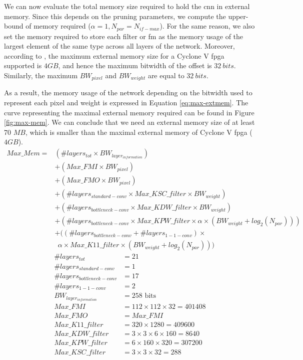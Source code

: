 %
We can now evaluate the total memory size required to hold the \acrshort{cnn} in external memory. Since this depends on the pruning parameters, we compute the upper-bound of memory required ($\alpha = 1, N_{par} = N_{if-max}$). For the same reason, we also set the memory required to store each filter or \acrshort{fm} as the memory usage of the largest element of the same type across all layers of the network. Moreover, according to \cite{noauthor_cyclone_2018}, the maximum external memory size for a Cyclone V \acrshort{fpga} supported is $4GB$, and hence the maximum bitwidth of the offset is $32 \ bits$. Similarly, the maximum $BW_{pixel}$ and $BW_{weight}$ are equal to $32 \ bits$.

As a result, the memory usage of the network depending on the bitwidth used to represent each pixel and weight is expressed in Equation \eqref{eq:max-extmem}.
The curve representing the maximal external memory required can be found in Figure \ref{fig:max-mem}. We can conclude that we need an external memory size of at least 70 $MB$, which is smaller than the maximal external memory of Cyclone V \acrshort{fpga} ($4 GB$).
%
\begin{equation}
    \begin{split}
        Max\_Mem = &\left(\# layers_{tot} \times BW_{layer_{information}} \right) \\
        &+ \left( Max\_FMI \times BW_{pixel} \right) \\
        &+ \left( Max\_FMO \times BW_{pixel} \right) \\
        &+ \left( \# layers_{standard-conv} \times Max\_KSC\_filter \times BW_{weight} \right) \\
        &+ \left( \# layers_{bottleneck-conv} \times Max\_KDW\_filter \times BW_{weight} \right)\\
        &+ \left( \# layers_{bottleneck-conv} \times Max\_KPW\_filter \times \alpha \times(BW_{weight} + log_2(N_{par})) \right)\\
        &+ ( \left(\# layers_{bottleneck-conv} + \# layers_{1-1-conv}\right) \times \\
        & \ \ \alpha \times Max\_K11\_filter \times  (BW_{weight} + log_2(N_{par})) )
    \end{split}
\label{eq:max-extmem}
\end{equation}
%
\begin{align*}
    \# layers_{tot} &= 21 \\
    \# layers_{standard-conv} &= 1 \\
    \# layers_{bottleneck-conv} &= 17 \\
    \# layers_{1-1-conv} &= 2 \\
    BW_{layer_{information}} &= 258 \text{ bits} \\
    Max\_FMI &= 112 \times 112 \times 32 = 401408 \\
    Max\_FMO &= Max\_FMI \\
    Max\_K11\_filter &= 320 \times 1280 = 409600 \\
    Max\_KDW\_filter &= 3 \times 3 \times 6 \times 160 = 8640\\
    Max\_KPW\_filter &= 6 \times 160 \times 320 = 307200 \\
    Max\_KSC\_filter &= 3 \times 3 \times 32 = 288
\end{align*}
